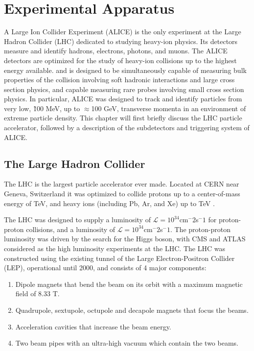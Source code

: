 
% 




\chapter{Experimental Apparatus} 
A Large Ion Collider Experiment (ALICE) is the only experiment at the Large Hadron Collider (LHC) dedicated to studying heavy-ion physics. Its detectors measure and identify hadrons, electrons, photons, and muons. The ALICE detectors are optimized for the study of heavy-ion collisions up to the highest energy available. and is designed to be simultaneously capable of measuring  bulk properties of the collision involving soft hadronic interactions and large cross section physics, and capable measuring rare probes involving small cross section physics. In particular, ALICE was designed to track and identify particles from very low,  \~100 MeV, up to $\approx$100 GeV, transverse momenta in an environment of extreme particle density. This chapter will first briefly discuss the LHC particle accelerator, followed by a description of the subdetectors and triggering system of ALICE.

\section{The Large Hadron Collider} 
\label{sec:LHC}

The LHC is the largest particle accelerator ever made. Located at CERN near Geneva, Switzerland  it was optimized to collide protons up to a center-of-mass energy of  TeV, and heavy ions (including Pb, Ar, and Xe) up to  TeV \cite{Evans2008}.

The LHC was designed to supply a luminosity of $\mathcal{L}=10^{34}$cm$^-2$s$^-1$ for proton-proton collisions, and a luminosity of $\mathcal{L}=10^{34}$cm$^-2$s$^-1$. The proton-proton luminosity was driven by the search for the Higgs boson, with CMS and ATLAS considered as the high luminosity experiments at the LHC. The LHC was constructed using the existing tunnel of the Large Electron-Positron Collider (LEP), operational until 2000, and consists of 4 major components:

\begin{enumerate}
	\item Dipole magnets that bend the beam on its orbit with a maximum magnetic field of 8.33 T. 
	\item Quadrupole, sextupole, octupole and decapole magnets that focus the beams.
	\item Acceleration cavities that increase the beam energy.
	\item Two beam pipes with an ultra-high vacuum  which contain the two beams.
\end{enumerate}


